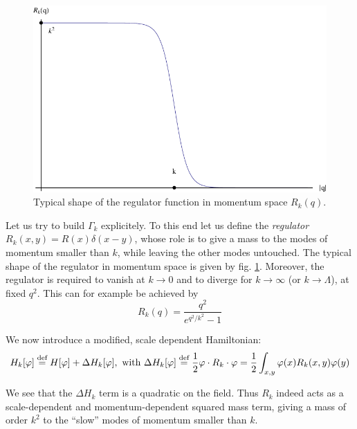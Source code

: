 \begin{figure}[htp]
\begin{center}
\includegraphics[scale=0.7]{img/chap2/regulator.pdf}
\caption{Typical shape of the regulator function in momentum space $R_k(q)$.}
\label{fig:regulator}
\end{center}
\end{figure}

Let us try to build $\Gamma_k$ explicitely.  To this end let us define the \textit{regulator} $R_k(x,y) = R(x) \delta(x-y)$, whose role is to give a mass to the modes of momentum smaller than $k$, while leaving the other modes untouched.
The typical shape of the regulator in momentum space is given by fig. \ref{fig:regulator}. Moreover, the regulator is required to vanish at $k \rightarrow 0$ and to diverge for $k \rightarrow \infty$ (or $k \rightarrow \Lambda$), at fixed $q^2$. This can for example be achieved by
\begin{equation}
R_k(q) = \frac{q^2}{e^{q^2/k^2} - 1}
\end{equation}

We now introduce a modified, scale dependent Hamiltonian:
\begin{equation}
H_k[\varphi]  \overset{\text{def}}{=}  H[\varphi] + \Delta H_k[\varphi], \text{~with~} \Delta H_k[\varphi]  \overset{\text{def}}{=}  \frac{1}{2} \varphi \cdot R_k \cdot \varphi = \frac{1}{2} \int_{x,y} \varphi(x) R_k(x,y) \varphi(y)
\end{equation}

We see that the $\Delta H_k$ term is a quadratic on the field. Thus $R_k$ indeed acts as a scale-dependent and momentum-dependent squared mass term, giving a mass of order $k^2$ to the ``slow'' modes of momentum smaller than $k$.

